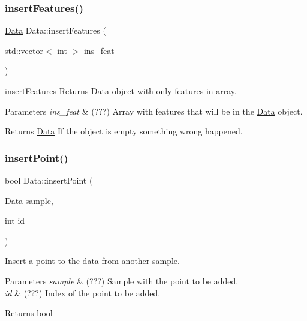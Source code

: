 \subsubsection{\texorpdfstring{insert\+Features()}{insertFeatures()}}
{\footnotesize\ttfamily \hyperlink{class_data}{Data} Data\+::insert\+Features (\begin{DoxyParamCaption}\item[{std\+::vector$<$ int $>$}]{ins\+\_\+feat }\end{DoxyParamCaption})}



insert\+Features Returns \hyperlink{class_data}{Data} object with only features in array. 


\begin{DoxyParams}{Parameters}
{\em ins\+\_\+feat} & (???) Array with features that will be in the \hyperlink{class_data}{Data} object. \\
\hline
\end{DoxyParams}
\begin{DoxyReturn}{Returns}
\hyperlink{class_data}{Data} If the object is empty something wrong happened. 
\end{DoxyReturn}
\mbox{\label{class_data_abb6aade47d78a284301c32e82b2cbee2}} 
\subsubsection{\texorpdfstring{insert\+Point()}{insertPoint()}\hspace{0.1cm}{\footnotesize\ttfamily [1/2]}}
{\footnotesize\ttfamily bool Data\+::insert\+Point (\begin{DoxyParamCaption}\item[{\hyperlink{class_data}{Data}}]{sample,  }\item[{int}]{id }\end{DoxyParamCaption})}



Insert a point to the data from another sample. 


\begin{DoxyParams}{Parameters}
{\em sample} & (???) Sample with the point to be added. \\
\hline
{\em id} & (???) Index of the point to be added. \\
\hline
\end{DoxyParams}
\begin{DoxyReturn}{Returns}
bool 
\end{DoxyReturn}
\mbox{\label{class_data_a4694df7867fa112b219bbf6ed17880e9}} 
